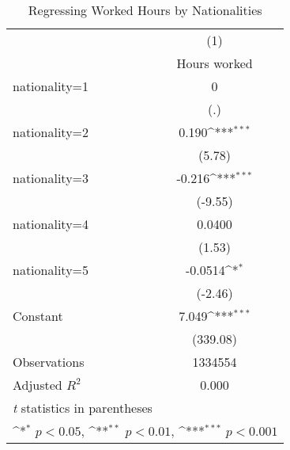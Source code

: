 \begin{table}[htbp]\centering
\def\sym#1{\ifmmode^{#1}\else\(^{#1}\)\fi}
\caption{Regressing Worked Hours by Nationalities}
\begin{tabular}{l*{1}{c}}
\hline\hline
                    &\multicolumn{1}{c}{(1)}\\
                    &\multicolumn{1}{c}{Hours worked}\\
\hline
nationality=1       &           0         \\
                    &         (.)         \\
[1em]
nationality=2       &       0.190\sym{***}\\
                    &      (5.78)         \\
[1em]
nationality=3       &      -0.216\sym{***}\\
                    &     (-9.55)         \\
[1em]
nationality=4       &      0.0400         \\
                    &      (1.53)         \\
[1em]
nationality=5       &     -0.0514\sym{*}  \\
                    &     (-2.46)         \\
[1em]
Constant            &       7.049\sym{***}\\
                    &    (339.08)         \\
\hline
Observations        &     1334554         \\
Adjusted \(R^{2}\)  &       0.000         \\
\hline\hline
\multicolumn{2}{l}{\footnotesize \textit{t} statistics in parentheses}\\
\multicolumn{2}{l}{\footnotesize \sym{*} \(p<0.05\), \sym{**} \(p<0.01\), \sym{***} \(p<0.001\)}\\
\end{tabular}
\end{table}
